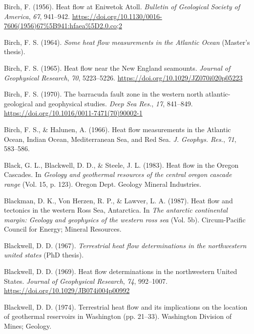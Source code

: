 \begin{CSLReferences}{1}{1}
\leavevmode{}%
Birch, F. (1956). Heat flow at {Eniwetok Atoll}. \emph{Bulletin of Geological Society of America}, \emph{67}, 941--942. \url{https://doi.org/10.1130/0016-7606(1956)67\%5B941:hfaea\%5D2.0.co;2}

\leavevmode{}%
Birch, F. S. (1964). \emph{Some heat flow measurements in the {Atlantic Ocean}} (Master's thesis).

\leavevmode{}%
Birch, F. S. (1965). Heat flow near the {New England} seamounts. \emph{Journal of Geophysical Research}, \emph{70}, 5223--5226. \url{https://doi.org/10.1029/JZ070i020p05223}

\leavevmode{}%
Birch, F. S. (1970). The barracuda fault zone in the western north atlantic- geological and geophysical studies. \emph{Deep Sea Res.}, \emph{17}, 841--849. \url{https://doi.org/10.1016/0011-7471(70)90002-1}

\leavevmode{}%
Birch, F. S., \& Halunen, A. (1966). Heat flow measurements in the {Atlantic Ocean, Indian Ocean, Mediterranean Sea, and Red Sea}. \emph{J. Geophys. Res.}, \emph{71}, 583--586.

\leavevmode{}%
Black, G. L., Blackwell, D. D., \& Steele, J. L. (1983). Heat flow in the {Oregon Cascades}. In \emph{Geology and geothermal resources of the central oregon cascade range} (Vol. 15, p. 123). Oregon Dept. Geology Mineral Industries.

\leavevmode{}%
Blackman, D. K., Von Herzen, R. P., \& Lawver, L. A. (1987). Heat flow and tectonics in the western {Ross Sea}, {Antarctica}. In \emph{The antarctic continental margin: Geology and geophysics of the western ross sea} (Vol. 5b). Circum-Pacific Council for Energy; Mineral Resources.

\leavevmode{}%
Blackwell, D. D. (1967). \emph{Terrestrial heat flow determinations in the northwestern united states} (PhD thesis).

\leavevmode{}%
Blackwell, D. D. (1969). Heat flow determinations in the northwestern {United States}. \emph{Journal of Geophysical Research}, \emph{74}, 992--1007. \url{https://doi.org/10.1029/JB074i004p00992}

\leavevmode{}%
Blackwell, D. D. (1974). Terrestrial heat flow and its implications on the location of geothermal reservoirs in {Washington} (pp. 21--33). Washington Division of Mines; Geology.


\end{CSLReferences}
